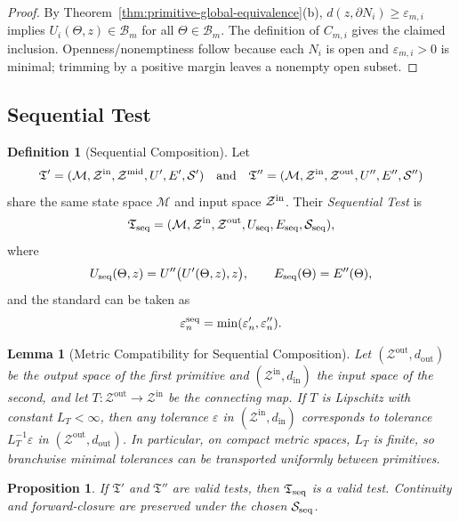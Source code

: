 \documentclass[12pt]{article}
\theoremstyle{definition}
\newtheorem{definition}{Definition}[section]
\theoremstyle{plain}
\newtheorem{lemma}{Lemma}[section]
\newtheorem{proposition}{Proposition}[section]
\begin{document}
\begin{proof}
By Theorem~\ref{thm:primitive-global-equivalence}(b), $d(z,\partial N_i)\ge \varepsilon_{m,i}$ implies $U_i(\Theta,z)\in\mathcal B_m$ for all $\Theta\in\mathcal B_m$. The definition of $C_{m,i}$ gives the claimed inclusion. Openness/nonemptiness follow because each $N_i$ is open and $\varepsilon_{m,i}>0$ is minimal; trimming by a positive margin leaves a nonempty open subset.
\end{proof}

\subsection{Sequential Test}
\label{subsec:sequential}

\begin{definition}[Sequential Composition]
Let
\[
  \mathfrak T'=(\mathcal M,\mathcal Z^{\rm in},\mathcal Z^{\rm mid},U',E',\mathcal S')\quad\text{and}\quad
  \mathfrak T''=(\mathcal M,\mathcal Z^{\rm in},\mathcal Z^{\rm out},U'',E'',\mathcal S'')
\]
share the same state space $\mathcal M$ and input space $\mathcal Z^{\rm in}$.  
Their \emph{Sequential Test} is
\[
  \mathfrak T_{\rm seq}
  =(\mathcal M,\mathcal Z^{\rm in},\mathcal Z^{\rm out},U_{\rm seq},E_{\rm seq},\mathcal S_{\rm seq}),
\]
where
\[
  U_{\rm seq}(\Theta,z)=U''\bigl(U'(\Theta,z),z\bigr),
  \qquad
  E_{\rm seq}(\Theta)=E''(\Theta),
\]
and the standard can be taken as
\[
  \varepsilon_n^{\rm seq}=\min(\varepsilon'_n,\varepsilon''_n).
\]
\end{definition}

\begin{lemma}[Metric Compatibility for Sequential Composition]
\label{lem:seq-metric-compat}
Let $(\mathcal{Z}^{\mathrm{out}},d_{\mathrm{out}})$ be the output space of the first primitive and $(\mathcal{Z}^{\mathrm{in}},d_{\mathrm{in}})$ the input space of the second, and let $T:\mathcal{Z}^{\mathrm{out}}\to\mathcal{Z}^{\mathrm{in}}$ be the connecting map. If $T$ is Lipschitz with constant $L_T<\infty$, then any tolerance $\varepsilon$ in $(\mathcal{Z}^{\mathrm{in}},d_{\mathrm{in}})$ corresponds to tolerance $L_T^{-1}\varepsilon$ in $(\mathcal{Z}^{\mathrm{out}},d_{\mathrm{out}})$. In particular, on compact metric spaces, $L_T$ is finite, so branchwise minimal tolerances can be transported uniformly between primitives.
\end{lemma}

\begin{proposition}
If $\mathfrak T'$ and $\mathfrak T''$ are valid tests, then $\mathfrak T_{\rm seq}$ is a valid test.  Continuity and forward‑closure are preserved under the chosen $\mathcal S_{\rm seq}$.
\end{proposition}
\end{document}
